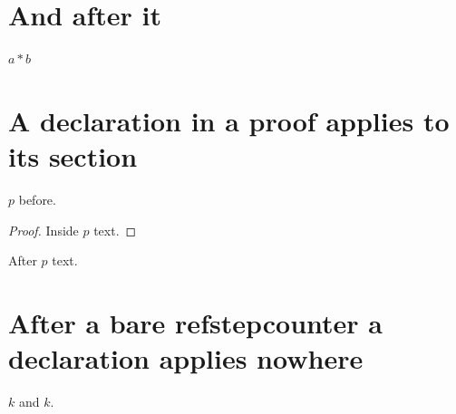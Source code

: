 \documentclass{article}
\begin{document}
\section{And after it}
$a*b$

\section{A declaration in a proof applies to its section}
$p$ before.
\begin{proof}
%
Inside $p$ text.
\end{proof}
After $p$ text.

\section{After a bare refstepcounter a declaration applies nowhere}
\label{foo1}$k$ and $k$.
\end{document}
